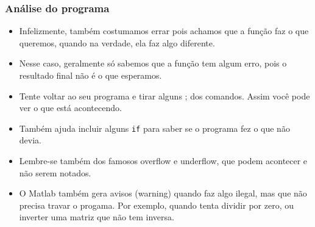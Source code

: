 \documentclass{beamer}
\begin{document}
\begin{frame}[fragile]
\frametitle{An\'alise do programa}

\begin{itemize}
 \item<1-> Infelizmente, tamb\'em costumamos errar pois achamos que a fun\c{c}\~ao faz o que queremos, quando na verdade, ela faz algo diferente.
 \item<2-> Nesse caso, geralmente s\'o sabemos que a fun\c{c}\~ao tem algum erro, pois o resultado final n\~ao \'e o que esperamos.
 \item<3-> Tente voltar ao seu programa e tirar alguns ; dos comandos. Assim voc\^e pode ver o que est\'a acontecendo.
 \item<4-> Tamb\'em ajuda incluir alguns {\tt if} para saber se o programa fez o que n\~ao devia.
 \item<5-> Lembre-se tamb\'em dos famosos overflow e underflow, que podem acontecer e n\~ao serem notados.
 \item<6-> O Matlab tamb\'em gera avisos (warning) quando faz algo ilegal, mas que n\~ao precisa travar o progama. Por exemplo, quando tenta dividir por zero, ou inverter uma matriz que n\~ao tem inversa.
\end{itemize}

\end{frame}
\end{document}
